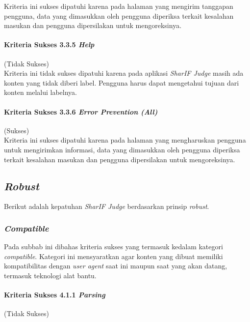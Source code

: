 Kriteria ini sukses dipatuhi karena pada halaman yang mengirim tanggapan pengguna, data yang dimasukkan oleh pengguna diperiksa terkait kesalahan masukan dan pengguna dipersilakan untuk mengoreksinya.

\paragraph{Kriteria Sukses 3.3.5 \textit{Help}}
\label{subsubsec:kepatuhan_kriteria_3.3.5}
(Tidak Sukses) \\

Kriteria ini tidak sukses dipatuhi karena
pada aplikasi \textit{SharIF Judge} masih ada konten yang tidak diberi label. Pengguna harus dapat mengetahui tujuan dari konten melalui labelnya.

\paragraph{Kriteria Sukses 3.3.6 \textit{Error Prevention (All)}}
\label{subsubsec:kepatuhan_kriteria_3.3.6}
(Sukses) \\

Kriteria ini sukses dipatuhi karena pada halaman yang mengharuskan pengguna untuk mengirimkan informasi, data yang dimasukkan oleh pengguna diperiksa terkait kesalahan masukan dan pengguna dipersilakan untuk mengoreksinya.

\subsection{\textit{Robust}}
\label{subsec:kepatuhan_robust}

Berikut adalah kepatuhan \textit{SharIF Judge} berdasarkan prinsip \textit{robust}.

\subsubsection{\textit{Compatible}}
\label{subsubsec:compatible}

Pada subbab ini dibahas kriteria sukses yang termasuk kedalam kategori \textit{compatible}. Kategori ini mensyaratkan agar konten yang dibuat memiliki kompatibilitas dengan \textit{user agent} saat ini maupun saat yang akan datang, termasuk teknologi alat bantu.

\paragraph{Kriteria Sukses 4.1.1 \textit{Parsing}}
\label{subsubsec:kepatuhan_kriteria_4.1.1}
(Tidak Sukses)\\


